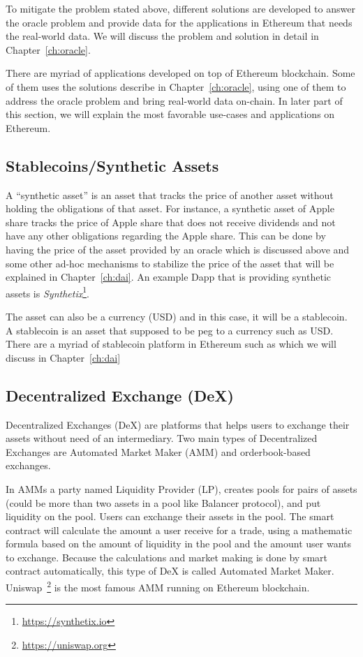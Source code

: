 To mitigate the problem stated above, different solutions are developed to answer the oracle problem and provide data for the applications in Ethereum that needs the real-world data. We will discuss the problem and solution in detail in Chapter~\ref{ch:oracle}.

There are myriad of applications developed on top of Ethereum blockchain. Some of them uses the solutions describe in  Chapter~\ref{ch:oracle}, using one of them to address the oracle problem and bring real-world data on-chain. In later part of this section, we will explain the most favorable use-cases and applications on Ethereum.

\subsection{Stablecoins/Synthetic Assets}

A ``synthetic asset'' is an asset that tracks the price of another asset without holding the obligations of that asset. For instance, a synthetic asset of Apple share tracks the price of Apple share that does not receive dividends and not have any other obligations regarding the Apple share. This can be done by having the price of the asset provided by an oracle which is discussed above and some other ad-hoc mechanisms to stabilize the price of the asset that will be explained in Chapter~\ref{ch:dai}. An example Dapp that is providing synthetic assets is \textit{Synthetix}\footnote{\url{https://synthetix.io}}.

The asset can also be a currency (\eg USD) and in this case, it will be a stablecoin. A stablecoin is an asset that supposed to be peg to a currency such as USD. There are a myriad of stablecoin platform in Ethereum such as \dai which we will discuss in Chapter~\ref{ch:dai}

\subsection{Decentralized Exchange (DeX)}
Decentralized Exchanges (DeX) are platforms that helps users to exchange their assets without need of an intermediary. Two main types of Decentralized Exchanges are Automated Market Maker (AMM) and orderbook-based exchanges. 

In AMMs a party named Liquidity Provider (LP), creates pools for pairs of assets (could be more than two assets in a pool like Balancer protocol), and put liquidity on the pool. Users can exchange their assets in the pool. The smart contract will calculate the amount a user receive for a trade, using a mathematic formula based on the amount of liquidity in the pool and the amount user wants to exchange. Because the calculations and market making is done by smart contract automatically, this type of DeX is called Automated Market Maker. Uniswap~\footnote{\url{https://uniswap.org}} is the most famous AMM running on Ethereum blockchain.

